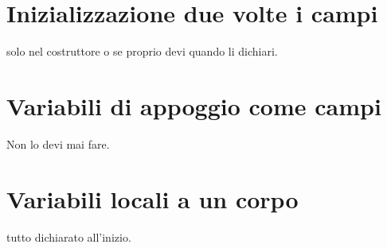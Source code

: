 \documentclass[11pt]{article}
\begin{document}
\section{Inizializzazione due volte i campi}
\label{sec:orgc5b8dd8}
solo nel costruttore o se proprio devi quando li dichiari.
\section{Variabili di appoggio come campi}
\label{sec:orgce975c4}
Non lo devi mai fare.
\section{Variabili locali a un corpo}
\label{sec:org2e61449}
tutto dichiarato all'inizio.
\end{document}
